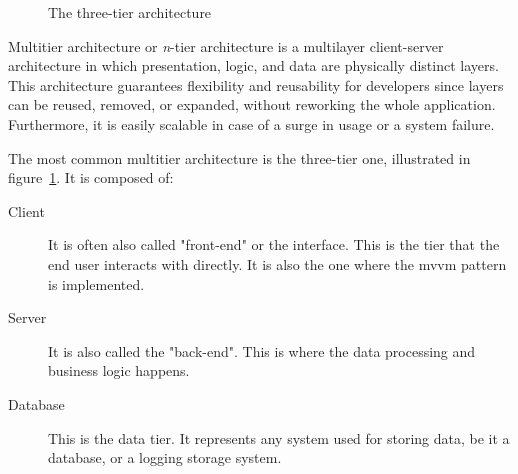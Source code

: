 \begin{toexclude}
\begin{figure}[H]

    \caption{The three-tier architecture}
    \label{fig:threetier-arch}
  \end{figure}

  Multitier architecture or \emph{n}-tier architecture is a multilayer client-server architecture in which presentation, logic, and data are physically distinct layers. This architecture guarantees flexibility and reusability for developers since layers can be reused, removed, or expanded, without reworking the whole application.
  Furthermore, it is easily scalable in case of a surge in usage or a system failure.

  The most common multitier architecture is the three-tier one, illustrated in figure~\ref{fig:threetier-arch}. It is composed of:
  \begin{description}
    \item[Client] It is often also called "front-end" or the interface.
          This is the tier that the end user interacts with directly.
          It is also the one where the \acrshort{mvvm} pattern is implemented.
    \item[Server] It is also called the "back-end".
          This is where the data processing and business logic happens.
    \item[Database] This is the data tier.
          It represents any system used for storing data, be it a database, or a logging storage system.
  \end{description}


\end{toexclude}
